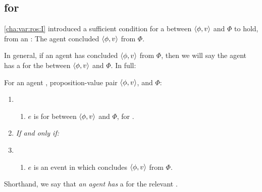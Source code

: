 \subsection{ for }
\label{cha:var:ros:W}

\begin{note}
  \autoref{cha:var:ros:I} introduced a sufficient condition for a \ros{} between \(\langle \phi, v \rangle\) and \(\Phi\) to hold, from an \agpe{}:
  The agent concluded \(\langle \phi, v \rangle\) from \(\Phi\).

  In general, if an agent has concluded \(\langle \phi, v \rangle\) from \(\Phi\), then we will say the agent has a \wit{} for the \ros{} between \(\langle \phi, v \rangle\) and \(\Phi\).
  In full:

  \begin{definition}
    \label{def:witnessing}
    For an agent \vAgent{}, proposition-value pair \(\langle \phi, v \rangle\), and \pool{} \(\Phi\):

    \begin{enumerate}[label=]
    \item
      \begin{enumerate}[label=\alph*., ref=(\alph*), series=WitnessDef]
      \item
        \(e\) is \emph{} for \ros{} between \(\langle \phi, v \rangle\) and \(\Phi\), for \vAgent{}.
      \end{enumerate}
    \item
      \emph{If and only if:}
    \item
      \begin{enumerate}[label=\alph*., ref=(\alph*), resume*=WitnessDef]
      \item
        \(e\) is an event in which \vAgent{} concludes \(\langle \phi, v \rangle\) from \(\Phi\).
      \end{enumerate}
    \end{enumerate}
    \vspace{-\baselineskip}
  \end{definition}

  Shorthand, we say that \emph{an agent has} a  for the relevant \ros{}.
\end{note}

